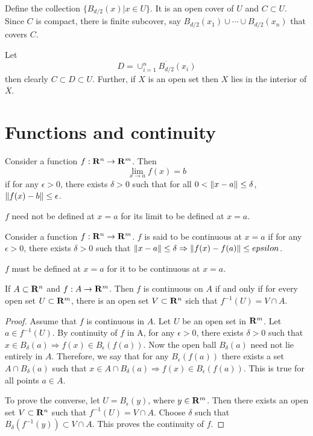 \begin{enumerate}
Define the collection $\{B_{d/2}(x) | x \in U\}$. It is an open cover of $U$
and $C \subset U$. Since $C$ is compact, there is finite subcover, say $
B_{d/2}(x_1) \cup \cdots \cup B_{d/2}(x_n)$ that covers $C$.

Let 
\[
D = \overline{\cup_{i=1}^n B_{d/2}(x_i)}
\]
then clearly $C \subset D \subset U$. Further, if $X$ is an open set then 
$X$ lies in the interior of $\overline{X}$.
\end{enumerate}

\section{Functions and continuity}\label{c1s3}
\begin{defn}\label{c1s3d1}
Consider a function $f: \mathbf{R}^n \rightarrow \mathbf{R}^m$. Then
\[
\lim_{x \rightarrow a}f(x) = b
\]
if for any $\epsilon > 0$, there exists $\delta > 0$ such that for all $0 < 
\left\Vert{x - a}\right\Vert \le \delta$, $\left\Vert{f(x) -b}\right\Vert \le \epsilon$.
\end{defn}
\begin{rem}
$f$ need not be defined at $x = a$ for its limit to be defined at $x = a$.
\end{rem}

\begin{defn}\label{c1s3d2}
Consider a function $f: \mathbf{R}^n \rightarrow \mathbf{R}^m$. $f$ is said to be continuous
at $x = a$ if for any $\epsilon > 0$, there exists $\delta > 0$ such that 
$\left\Vert{x - a}\right\Vert \le \delta \Rightarrow \left\Vert{f(x) - f(a)}\right\Vert \le epsilon$.
\end{defn}
\begin{rem}
$f$ must be defined at $x = a$ for it to be continuous at $x = a$.
\end{rem}

\begin{thm}\label{c1s3t1}
If $A \subset \mathbf{R}^n$ and $f: A \rightarrow \mathbf{R}^m$. Then $f$ is continuous
on $A$ if and only if for every open set $U \subset \mathbf{R}^m$, there is an open 
set $V \subset \mathbf{R}^n$ sich that $f^{-1}(U) = V \cap A$.
\end{thm}
\begin{proof}
Assume that $f$ is continuous in $A$. Let $U$ be an open set in $\mathbf{R}^m$.
Let $a \in f^{-1}(U)$. By continuity of $f$ in A, for any $\epsilon > 0$, there
exists $\delta > 0$ such that $x \in B_\delta(a) \Rightarrow f(x) \in B_\epsilon
(f(a))$. Now the open ball $B_\delta(a)$ need not lie entirely in $A$. Therefore, we say that for any $B_\epsilon(f(a))$ there exists a set $A \cap B_\delta(a)$
such that $x \in A \cap B_\delta(a) \Rightarrow f(x) \in B_\epsilon(f(a))$. This
is true for all points $a \in A$.

To prove the converse, let $U = B_\epsilon(y)$, where $y \in \mathbf{R}^m$. Then
there exists an open set $V \subset \mathbf{R}^n$ such that $f^{-1}(U) = V \cap A$.
Choose $\delta$ such that $B_\delta(f^{-1}(y)) \subset V \cap A$. This proves
the continuity of $f$.
\end{proof}

